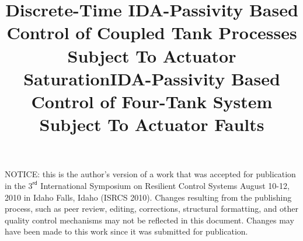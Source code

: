 



\ifx\techreport\undefined
\title{\large Discrete-Time IDA-Passivity Based Control of Coupled Tank Processes Subject
  To Actuator Saturation}
\else
\title{IDA-Passivity Based Control of Four-Tank System Subject
  To Actuator Faults}
\fi
\author{}
\ifx\techreport\undefined
\else

\fi

\ifx\techreport\undefined
\maketitle
\else
{\small NOTICE: this is the author's version of a work that was accepted for
publication in the $3^{\mathsf{rd}}$ International Symposium on
Resilient Control Systems August 10-12, 2010 in Idaho Falls, Idaho
(ISRCS 2010).  Changes resulting from the publishing process, such as
peer review, editing, corrections, structural formatting, and other
quality control mechanisms may not be reflected in this
document. Changes may have been made to this work since it was
submitted for publication.}\\
\fi









\appendices
%

